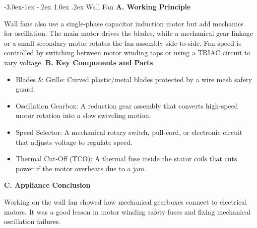 \documentclass[11pt,a4paper]{report}
\makeatletter
\renewcommand{\subsection}{\@startsection{subsection}{2}{\z@}%
  {-3.0ex\@plus -1ex \@minus -.2ex}%
  {1.0ex \@plus .2ex}%
  {\normalfont\large\bfseries\color{secondaryColor}}}
\makeatother
\begin{document}
\subsection{Wall Fan}
\noindent\textbf{A. Working Principle}\par\medskip
Wall fans also use a single-phase capacitor induction motor but add mechanics for oscillation. The main motor drives the blades, while a mechanical gear linkage or a small secondary motor rotates the fan assembly side-to-side. Fan speed is controlled by switching between motor winding taps or using a TRIAC circuit to vary voltage.
\noindent\textbf{B. Key Components and Parts}\par\medskip
\begin{itemize}
  \item Blades \& Grille: Curved plastic/metal blades protected by a wire mesh safety guard.
  \item Oscillation Gearbox: A reduction gear assembly that converts high-speed motor rotation into a slow swiveling motion.
  \item Speed Selector: A mechanical rotary switch, pull-cord, or electronic circuit that adjusts voltage to regulate speed.
  \item Thermal Cut-Off (TCO): A thermal fuse inside the stator coils that cuts power if the motor overheats due to a jam.
\end{itemize}
\noindent\textbf{C. Appliance Conclusion}\par\medskip
Working on the wall fan showed how mechanical gearboxes connect to electrical motors. It was a good lesson in motor winding safety fuses and fixing mechanical oscillation failures.
\end{document}
